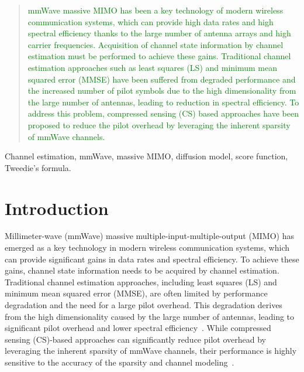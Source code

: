 \documentclass[lettersize,journal]{IEEEtran}
\begin{document}
\maketitle
\begin{abstract}
\textcolor{green}{
  mmWave massive MIMO has been a key technology of modern wireless communication systems, which can provide high data rates and high spectral efficiency thanks to the large number of antenna arrays and high carrier frequencies. Acquisition of channel state information by channel estimation must be performed to achieve these gains. Traditional channel estimation approaches such as least squares (LS) and minimum mean squared error (MMSE) have been suffered from degraded performance and the increased number of pilot symbols due to the high dimensionality from the large number of antennas, leading to reduction in spectral efficiency. To address this problem, compressed sensing (CS) based approaches have been proposed to reduce the pilot overhead by leveraging the inherent sparsity of mmWave channels.
}
\end{abstract}

\begin{IEEEkeywords}
Channel estimation, mmWave, massive MIMO, diffusion model, score function, Tweedie's formula.
\end{IEEEkeywords}


\section{Introduction}

Millimeter-wave (mmWave) massive multiple-input-multiple-output (MIMO) has emerged as a key technology in modern wireless communication systems, which can provide significant gains in data rates and spectral efficiency. To achieve these gains, channel state information needs to be acquired by channel estimation. Traditional channel estimation approaches, including least squares (LS) and minimum mean squared error (MMSE), are often limited by performance degradation and the need for a large pilot overhead. This degradation derives from the high dimensionality caused by the large number of antennas, leading to significant pilot overhead and lower spectral efficiency~\cite{hassibiHowMuchTraining2003}. While compressed sensing (CS)-based approaches can significantly reduce pilot overhead by leveraging the inherent sparsity of mmWave channels, their performance is highly sensitive to the accuracy of the sparsity and channel modeling~\cite{zhangAtomicNormDenoisingBased2018,mendez-rialHybridMIMOArchitectures2016,choiCompressedSensingWireless2017}.
\end{document}
